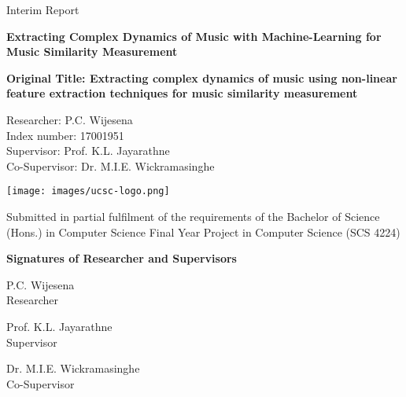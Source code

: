 \documentclass[12pt]{extarticle}
\begin{document}
\begin{titlepage}
    \begin{center}
        
        \Large
        Interim Report
            
        \Huge
        \textbf{Extracting Complex Dynamics of Music with Machine-Learning for Music Similarity Measurement}
            
        \vspace{0.5cm}
        
        \small
        \textbf{Original Title: Extracting complex dynamics of music using non-linear feature extraction  techniques for music similarity measurement}
            
        \vspace{1.5cm}
        \Large
            
        \vfill
        Researcher: P.C. Wijesena\\
        Index number: 17001951\\
        
        \vspace{5mm} %
        Supervisor: Prof. K.L. Jayarathne\\
        
        Co-Supervisor: Dr. M.I.E. Wickramasinghe\\
        \normalsize

        \vspace{1.5cm}

        \texttt{[image: images/ucsc-logo.png]}  
       
        Submitted in partial fulfilment of the requirements of the
Bachelor of Science (Hons.) in Computer Science
Final Year Project in Computer Science (SCS 4224)

    \end{center}
\end{titlepage}

\begin{center}
    

\Large
\textbf{Signatures of Researcher and Supervisors}

\vfill

\dotfill

\large
P.C. Wijesena\\
Researcher

\vfill


\dotfill

\large
Prof. K.L. Jayarathne\\
Supervisor

\vfill



\dotfill

\large
Dr. M.I.E. Wickramasinghe\\
Co-Supervisor

\end{center}
\end{document}
